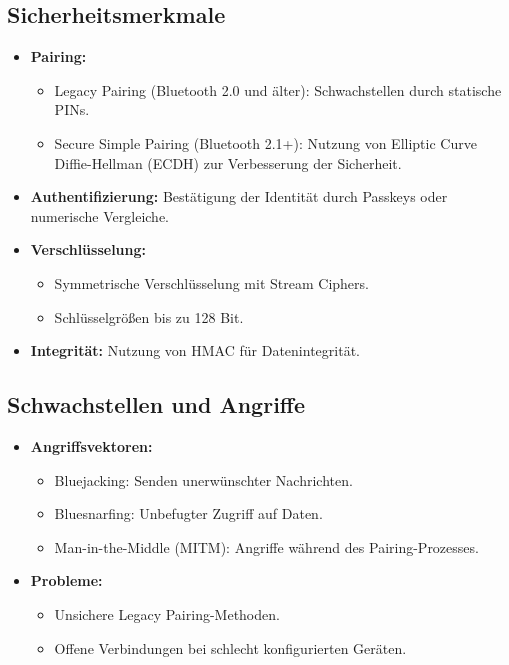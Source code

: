 \documentclass{article}
\begin{document}
\subsection{Sicherheitsmerkmale}
\begin{itemize}
    \item \textbf{Pairing:}
    \begin{itemize}
        \item Legacy Pairing (Bluetooth 2.0 und älter): Schwachstellen durch statische PINs.
        \item Secure Simple Pairing (Bluetooth 2.1+): Nutzung von Elliptic Curve Diffie-Hellman (ECDH) zur Verbesserung der Sicherheit.
    \end{itemize}
    \item \textbf{Authentifizierung:} Bestätigung der Identität durch Passkeys oder numerische Vergleiche.
    \item \textbf{Verschlüsselung:} 
    \begin{itemize}
        \item Symmetrische Verschlüsselung mit Stream Ciphers.
        \item Schlüsselgrößen bis zu 128 Bit.
    \end{itemize}
    \item \textbf{Integrität:} Nutzung von HMAC für Datenintegrität.
\end{itemize}

\subsection{Schwachstellen und Angriffe}
\begin{itemize}
    \item \textbf{Angriffsvektoren:}
    \begin{itemize}
        \item Bluejacking: Senden unerwünschter Nachrichten.
        \item Bluesnarfing: Unbefugter Zugriff auf Daten.
        \item Man-in-the-Middle (MITM): Angriffe während des Pairing-Prozesses.
    \end{itemize}
    \item \textbf{Probleme:}
    \begin{itemize}
        \item Unsichere Legacy Pairing-Methoden.
        \item Offene Verbindungen bei schlecht konfigurierten Geräten.
    \end{itemize}
\end{itemize}
\end{document}
